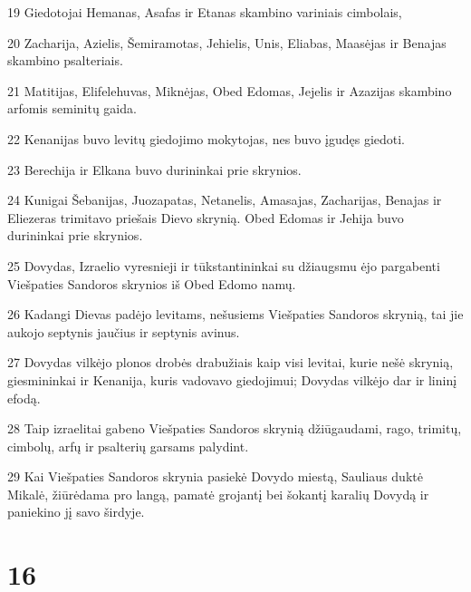 \par 19 Giedotojai Hemanas, Asafas ir Etanas skambino variniais cimbolais, 
\par 20 Zacharija, Azielis, Šemiramotas, Jehielis, Unis, Eliabas, Maasėjas ir Benajas skambino psalteriais. 
\par 21 Matitijas, Elifelehuvas, Miknėjas, Obed Edomas, Jejelis ir Azazijas skambino arfomis seminitų gaida. 
\par 22 Kenanijas buvo levitų giedojimo mokytojas, nes buvo įgudęs giedoti. 
\par 23 Berechija ir Elkana buvo durininkai prie skrynios. 
\par 24 Kunigai Šebanijas, Juozapatas, Netanelis, Amasajas, Zacharijas, Benajas ir Eliezeras trimitavo priešais Dievo skrynią. Obed Edomas ir Jehija buvo durininkai prie skrynios. 
\par 25 Dovydas, Izraelio vyresnieji ir tūkstantininkai su džiaugsmu ėjo pargabenti Viešpaties Sandoros skrynios iš Obed Edomo namų. 
\par 26 Kadangi Dievas padėjo levitams, nešusiems Viešpaties Sandoros skrynią, tai jie aukojo septynis jaučius ir septynis avinus. 
\par 27 Dovydas vilkėjo plonos drobės drabužiais kaip visi levitai, kurie nešė skrynią, giesmininkai ir Kenanija, kuris vadovavo giedojimui; Dovydas vilkėjo dar ir lininį efodą. 
\par 28 Taip izraelitai gabeno Viešpaties Sandoros skrynią džiūgaudami, rago, trimitų, cimbolų, arfų ir psalterių garsams palydint. 
\par 29 Kai Viešpaties Sandoros skrynia pasiekė Dovydo miestą, Sauliaus duktė Mikalė, žiūrėdama pro langą, pamatė grojantį bei šokantį karalių Dovydą ir paniekino jį savo širdyje.



\chapter{16}


